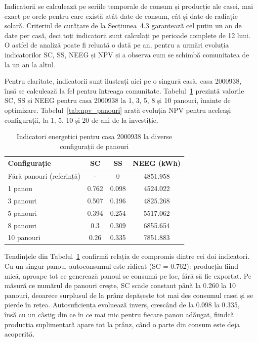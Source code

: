\documentclass[12pt,a4paper]{report}
\begin{document}
Indicatorii se calculează pe seriile temporale de consum și producție ale casei, mai exact pe orele pentru care există atât date de consum, cât și date de radiație solară. Criteriul de curățare de la Secțiunea~4.3 garantează cel puțin un an de date per casă, deci toți indicatorii sunt calculați pe perioade complete de 12 luni. O astfel de analiză poate fi reluată o dată pe an, pentru a urmări evoluția indicatorilor SC, SS, NEEG și NPV și a observa cum se schimbă comunitatea de la un an la altul.

Pentru claritate, indicatorii sunt ilustrați aici pe o singură casă, casa 2000938, însă se calculează la fel pentru întreaga comunitate. Tabelul~\ref{tab:indicatori_initial} prezintă valorile SC, SS și NEEG pentru casa 2000938 la 1, 3, 5, 8 și 10 panouri, înainte de optimizare. Tabelul~\ref{tab:npv_panouri} arată evoluția NPV pentru aceleași configurații, la 1, 5, 10 și 20 de ani de la investiție.

\begin{table}[h]
  \centering
  \begin{tabular}{|l|c|c|c|}
    \hline
    \textbf{Configurație}    & \textbf{SC} & \textbf{SS} & \textbf{NEEG (kWh)} \\
    \hline
    Fără panouri (referință) & -           & 0           & 4851.958            \\
    \hline
    1 panou                  & 0.762       & 0.098       & 4524.022            \\
    \hline
    3 panouri                & 0.507       & 0.196       & 4825.268            \\
    \hline
    5 panouri                & 0.394       & 0.254       & 5517.062            \\
    \hline
    8 panouri                & 0.3         & 0.309       & 6855.654            \\
    \hline
    10 panouri               & 0.26        & 0.335       & 7851.883            \\
    \hline
  \end{tabular}
  \caption{Indicatori energetici pentru casa 2000938 la diverse configurații de panouri}
  \label{tab:indicatori_initial}
\end{table}

Tendințele din Tabelul~\ref{tab:indicatori_initial} confirmă relația de compromis dintre cei doi indicatori. Cu un singur panou, autoconsumul este ridicat (SC = 0.762): producția fiind mică, aproape tot ce generează panoul se consumă pe loc, fără să fie exportat. Pe măsură ce numărul de panouri crește, SC scade constant până la 0.260 la 10 panouri, deoarece surplusul de la prânz depășește tot mai des consumul casei și se pierde în rețea. Autosuficiența evoluează invers, crescând de la 0.098 la 0.335, însă cu un câștig din ce în ce mai mic pentru fiecare panou adăugat, fiindcă producția suplimentară apare tot la prânz, când o parte din consum este deja acoperită.
\end{document}
